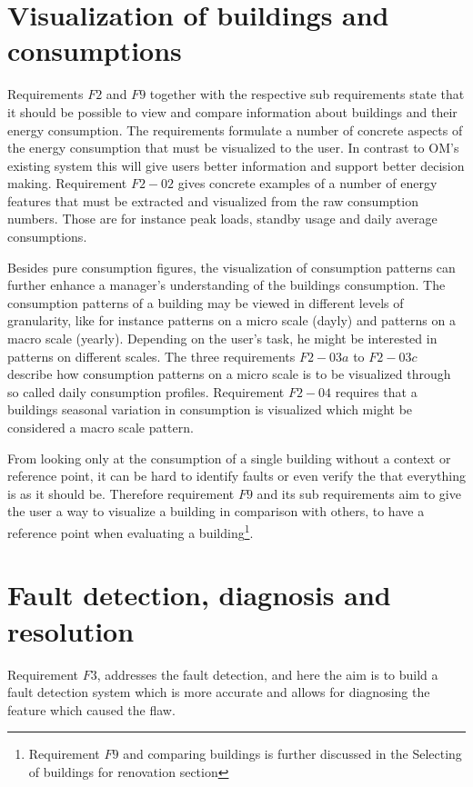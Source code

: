 \section{Visualization of buildings and consumptions}
Requirements $F2$ and $F9$ together with the respective sub requirements state that it should be possible to view and compare information about buildings and their energy consumption. The requirements formulate a number of concrete aspects of the energy consumption that must be visualized to the user. In contrast to OM’s existing system this will give users better information and support better decision making. Requirement $F2-02$ gives concrete examples of a number of energy features that must be extracted and visualized from the raw consumption numbers. Those are for instance peak loads, standby usage and daily average consumptions.

Besides pure consumption figures, the visualization of consumption patterns can further enhance a manager's understanding of the buildings consumption. The consumption patterns of a building may be viewed in different levels of granularity, like for instance patterns on a micro scale (dayly) and patterns on a macro scale (yearly). Depending on the user’s task, he might be interested in patterns on different scales. The three requirements $F2-03a$ to $F2-03c$  describe how consumption patterns on a micro scale is to be visualized through so called daily consumption profiles. Requirement $F2-04$ requires that a buildings seasonal variation in consumption is visualized which might be considered a macro scale pattern. 

From looking only at the consumption of a single building without a context or reference point, it can be hard to identify faults or even verify the that everything is as it should be. Therefore requirement $F9$ and its sub requirements aim to give the user a way to visualize a building in comparison with others, to have a reference point when evaluating a building\footnote{Requirement $F9$ and comparing buildings is further discussed in the Selecting of buildings for renovation section}. 
\section{Fault detection, diagnosis and resolution}
Requirement $F3$, addresses the fault detection, and here the aim is to build a fault detection system which is more accurate and allows for diagnosing the feature which caused the flaw. 

